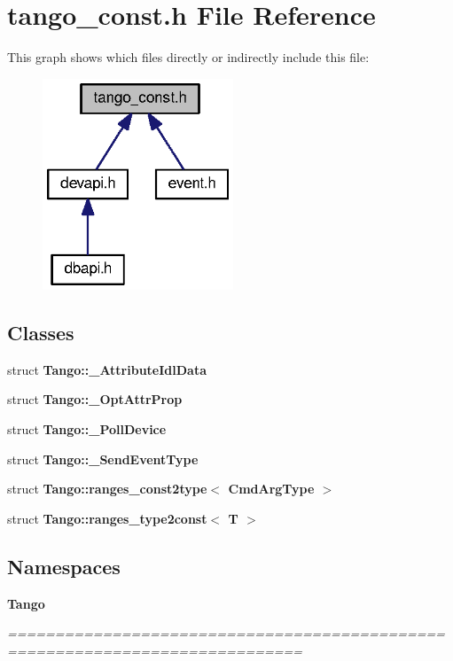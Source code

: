 \section{tango\-\_\-const.\-h File Reference}
\label{tango__const_8h}
This graph shows which files directly or indirectly include this file\-:
\nopagebreak
\begin{figure}[H]
\begin{center}
\leavevmode
\includegraphics[width=161pt]{dd/d73/tango__const_8h__dep__incl}
\end{center}
\end{figure}
\subsection*{Classes}
\begin{DoxyCompactItemize}
\item 
struct {\bf Tango\-::\-\_\-\-Attribute\-Idl\-Data}
\item 
struct {\bf Tango\-::\-\_\-\-Opt\-Attr\-Prop}
\item 
struct {\bf Tango\-::\-\_\-\-Poll\-Device}
\item 
struct {\bf Tango\-::\-\_\-\-Send\-Event\-Type}
\item 
struct {\bf Tango\-::ranges\-\_\-const2type$<$ Cmd\-Arg\-Type $>$}
\item 
struct {\bf Tango\-::ranges\-\_\-type2const$<$ T $>$}
\end{DoxyCompactItemize}
\subsection*{Namespaces}
\begin{DoxyCompactItemize}
\item 
{\bf Tango}
\begin{DoxyCompactList}\small\item\em ============================================================================= \end{DoxyCompactList}\end{DoxyCompactItemize}
